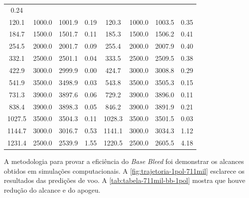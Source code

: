 \begin{table}[ht]
{\begin{tabular}{c|c|c|c|c|c|c|c}
      \num{0,24} \\
    \num{120,1} &
      \num{1000,0} &
      \num{1001,9} &
      \num{0,19} &
      \num{120,3} &
      \num{1000,0} &
      \num{1003,5} &
      \num{0,35} \\
    \num{184,7} &
      \num{1500,0} &
      \num{1501,7} &
      \num{0,11} &
      \num{185,3} &
      \num{1500,0} &
      \num{1506,2} &
      \num{0,41} \\
    \num{254,5} &
      \num{2000,0} &
      \num{2001,7} &
      \num{0,09} &
      \num{255,4} &
      \num{2000,0} &
      \num{2007,9} &
      \num{0,40} \\
    \num{332,1} &
      \num{2500,0} &
      \num{2501,1} &
      \num{0,04} &
      \num{333,5} &
      \num{2500,0} &
      \num{2509,5} &
      \num{0,38} \\
    \num{422,9} &
      \num{3000,0} &
      \num{2999,9} &
      \num{0,00} &
      \num{424,7} &
      \num{3000,0} &
      \num{3008,8} &
      \num{0,29} \\
    \num{541,9} &
      \num{3500,0} &
      \num{3498,9} &
      \num{0,03} &
      \num{543,8} &
      \num{3500,0} &
      \num{3505,3} &
      \num{0,15} \\
    \num{731,3} &
      \num{3900,0} &
      \num{3897,6} &
      \num{0,06} &
      \num{729,2} &
      \num{3900,0} &
      \num{3896,0} &
      \num{0,11} \\
    \num{838,4} &
      \num{3900,0} &
      \num{3898,3} &
      \num{0,05} &
      \num{846,2} &
      \num{3900,0} &
      \num{3891,9} &
      \num{0,21} \\
    \num{1027,5} &
      \num{3500,0} &
      \num{3504,3} &
      \num{0,11} &
      \num{1028,3} &
      \num{3500,0} &
      \num{3501,5} &
      \num{0,03} \\
    \num{1144,7} &
      \num{3000,0} &
      \num{3016,7} &
      \num{0,53} &
      \num{1141,1} &
      \num{3000,0} &
      \num{3034,3} &
      \num{1,12} \\
    \num{1231,4} &
      \num{2500,0} &
      \num{2539,9} &
      \num{1,55} &
      \num{1220,5} &
      \num{2500,0} &
      \num{2605,5} &
      \num{4,18} \\ \hline
    \end{tabular}%
    }
    \label{tab:tabela-validacao-PRODAS-e-tabela-de-tiro-M107}
\end{table}

A metodologia para provar a eficiência do \textit{Base Bleed} foi demonstrar os alcances obtidos em simulações computacionais. A \autoref{fig:trajetoria-1pol-711mil} esclarece os resultados das predições de voo. A \autoref{tab:tabela-711mil-bb-1pol} mostra que houve redução do alcance e do apogeu.


